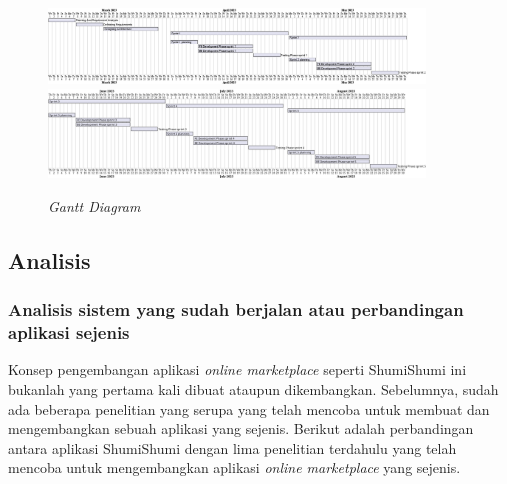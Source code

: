 \documentclass[a4paper]{article}
\newcommand{\subbab}[1]{%
    \subsection{#1}%
    \setcounter{figure}{0}
    \setcounter{table}{0}
}
\newcommand{\subsubbab}[1]{%
    \subsubsection{#1}%
}
\begin{document}
\begin{figure}[h]
    \centering
    \includegraphics*[width=10cm]{./images/gantt1/sprint timeline.png}
    \includegraphics*[width=10cm]{./images/gantt1/sprint timeline 2.png}
    \caption{\textit{Gantt Diagram}}
\end{figure}

\subbab{Analisis}
\subsubbab{Analisis sistem yang sudah berjalan atau perbandingan aplikasi sejenis}

Konsep pengembangan aplikasi \textit{online marketplace} seperti ShumiShumi ini bukanlah yang pertama kali dibuat ataupun dikembangkan. Sebelumnya, sudah ada beberapa penelitian yang serupa yang telah mencoba untuk membuat dan mengembangkan sebuah aplikasi yang sejenis. Berikut adalah perbandingan antara aplikasi ShumiShumi dengan lima penelitian terdahulu yang telah mencoba untuk mengembangkan aplikasi \textit{online marketplace} yang sejenis.
\end{document}
